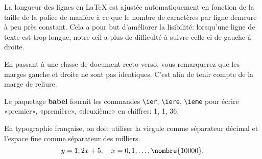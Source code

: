 \documentclass[12pt,french]{memoir}
\begin{document}
La longueur des lignes en {\LaTeX} est ajustée automatiquement en
fonction de la taille de la police de manière à ce que le nombre de
caractères par ligne demeure à peu près constant. Cela a pour but
d'améliorer la lisibilité: lorsqu'une ligne de texte est trop longue,
notre œil a plus de difficulté à suivre celle-ci de gauche à droite.

En passant à une classe de document recto verso, vous remarquerez que
les marges gauche et droite ne sont pas identiques. C'est afin de
tenir compte de la marge de reliure.

Le paquetage \textbf{babel} fournit les commandes \verb=\ier=,
\verb=\iere=, \verb=\ieme= pour écrire «premier», «première»,
«deuxième» en chiffres: 1{\ier}, 1{\iere}, 36{\ieme}.

En typographie française, on doit utiliser la virgule comme séparateur
décimal et l'espace fine comme séparateur des milliers.
\begin{displaymath}
  y = 1,2x + 5, \quad x = 0, 1, \dots, \nombre{10 000}.
\end{displaymath}
\end{document}
